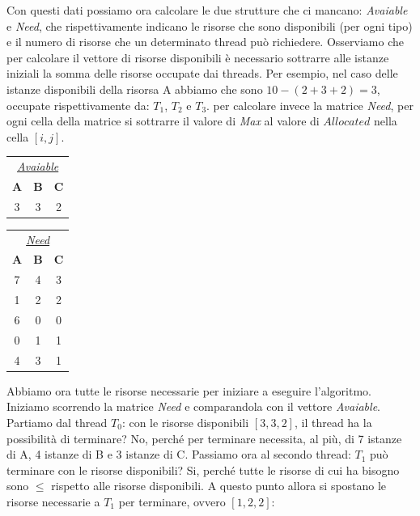 Con questi dati possiamo ora calcolare le due strutture che ci mancano: \textit{Avaiable} e \textit{Need}, che rispettivamente indicano le risorse che sono disponibili (per ogni tipo) e il numero di risorse che un determinato thread può richiedere. Osserviamo che per calcolare il vettore di risorse disponibili è necessario sottrarre alle istanze iniziali la somma delle risorse occupate dai threads. Per esempio, nel caso delle istanze disponibili della risorsa A abbiamo che sono $10 - (2 + 3 + 2) = 3$, occupate rispettivamente da: $T_1$, $T_2$ e $T_3$. per calcolare invece la matrice \textit{Need}, per ogni cella della matrice si sottrarre il valore di \textit{Max} al valore di $Allocated$ nella cella $[i,j]$.
\begin{table}[h!]
    \centering
        \begin{tabular}{c c c}
         \multicolumn{3}{c}{\underline{\textit{Avaiable}}} \\
         \textbf{A} & \textbf{B} & \textbf{C} \\
         3 & 3 & 2
    \end{tabular}
    \hspace{5pt}    
    \begin{tabular}{c c c}
         \multicolumn{3}{c}{\underline{\textit{Need}}} \\
         \textbf{A} & \textbf{B} & \textbf{C} \\
         7 & 4 & 3 \\
         1 & 2 & 2 \\
         6 & 0 & 0 \\
         0 & 1 & 1 \\
         4 & 3 & 1 \\
    \end{tabular}
\end{table}

Abbiamo ora tutte le risorse necessarie per iniziare a eseguire l'algoritmo. Iniziamo scorrendo la matrice \textit{Need} e comparandola con il vettore \textit{Avaiable}. Partiamo dal thread $T_0$: con le risorse disponibili $[3,3,2]$, il thread ha la possibilità di terminare? No, perché per terminare necessita, al più, di 7 istanze di A, 4 istanze di B e 3 istanze di C. Passiamo ora al secondo thread: $T_1$ può terminare con le risorse disponibili? Si, perché tutte le risorse di cui ha bisogno sono $\leq$ rispetto alle risorse disponibili. A questo punto allora si spostano le risorse necessarie a $T_1$ per terminare, ovvero $[1,2,2]$:

